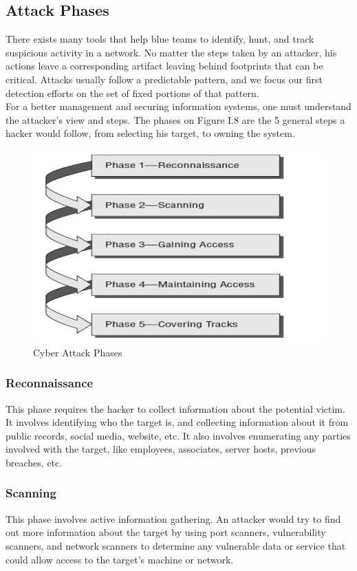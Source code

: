 \subsection{Attack Phases}
There exists many tools that help blue teams to identify, hunt, and track suspicious activity in a network. No matter the steps taken by an attacker, his actions leave a corresponding artifact leaving behind footprints that can be critical. Attacks usually follow a predictable pattern, and we focus our first detection efforts on the set of fixed portions of that pattern.\\
For a better management and securing information systems, one must understand the attacker's view and steps. The phases on Figure I.8 are the 5 general steps a hacker would follow, from selecting his target, to owning the system.
\begin{figure}[H]
\centering
\includegraphics[width=0.6\columnwidth]{Figures/attack_phases.png}
\caption{Cyber Attack Phases\cite{attackphases}}
\label{fig_logo_utm}
\end{figure}
\subsubsection{Reconnaissance}
This phase requires the hacker to collect information about the potential victim. It involves identifying who the target is, and collecting information about it from public records, social media, website, etc. It also involves enumerating any parties involved with the target, like employees, associates, server hosts, previous breaches, etc.
\subsubsection{Scanning}
This phase involves active information gathering. An attacker would try to find out more information about the target by using port scanners, vulnerability scanners, and network scanners to determine any vulnerable data or service that could allow access to the target's machine or network.

